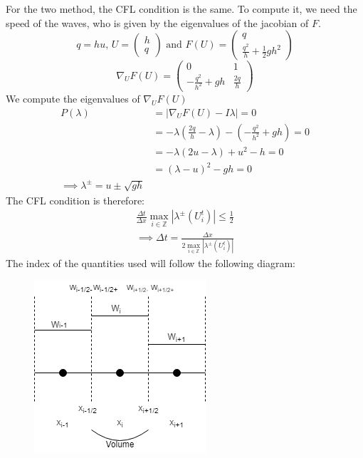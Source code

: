         For the two method, the CFL condition is the same. To compute it, we need the speed of the waves, who is given by the eigenvalues of the jacobian of $F$.
        \begin{equation*}
            q= hu \text{, } U = \begin{pmatrix} h\\ q\end{pmatrix}\text{ and } F(U) = \begin{pmatrix} q\\ \frac{q^2}{h} + \frac{1}{2}gh^2\end{pmatrix}
        \end{equation*}
        \begin{equation*}
            \nabla_U F(U) = \begin{pmatrix} 0& 1 \\ -\frac{q^2}{h^2}+gh &\frac{2q}{h}\end{pmatrix}
        \end{equation*}
        We compute the eigenvalues of $\nabla_U F(U)$
        \begin{align*}
            P(\lambda)  &= | \nabla_U F(U) - I\lambda| = 0\\
                        &= -\lambda (\frac{2q}{h} -\lambda) - (-\frac{q^2}{h^2} + gh)=0\\
                        &= -\lambda (2u-\lambda) + u^2 -h =0\\
                        &= (\lambda -u)^2-gh = 0 \\
                        \implies \lambda^\pm = u\pm \sqrt{gh}
        \end{align*}
        The CFL condition is therefore:
        \begin{align*}
            \frac{\Delta t}{\Delta x}\max_{i\in \mathds{Z}} \left| \lambda ^\pm(U^t_i)\right| \leq \frac{1}{2}\\
            \implies \Delta t= \frac{\Delta x}{2\max_{i\in \mathds{Z}} \left| \lambda ^\pm(U^t_i)\right|}
        \end{align*}
        The index of the quantities used will follow the following diagram:
        \begin{figure}[h]
            \centering
            \includegraphics{1storder.png}
            \label{repidx}
        \end{figure}
        
